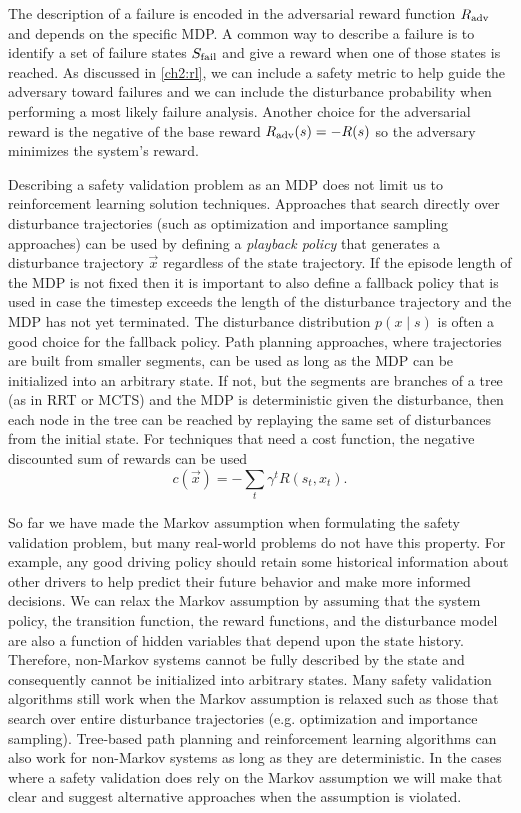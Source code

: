 The description of a failure is encoded in the adversarial reward function $R_{\rm adv}$ and depends on the specific MDP. A common way to describe a failure is to identify a set of failure states $S_{\rm fail}$ and give a reward when one of those states is reached. As discussed in \cref{ch2:rl}, we can include a safety metric to help guide the adversary toward failures and we can include the disturbance probability when performing a most likely failure analysis. Another choice for the adversarial reward is the negative of the base reward $R_{\rm adv}(s) = - R(s)$ so the adversary minimizes the system's reward. 

Describing a safety validation problem as an MDP does not limit us to reinforcement learning solution techniques. Approaches that search directly over disturbance trajectories (such as optimization and importance sampling approaches) can be used by defining a \emph{playback policy} that generates a disturbance trajectory $\vec{x}$ regardless of the state trajectory. If the episode length of the MDP is not fixed then it is important to also define a fallback policy that is used in case the timestep exceeds the length of the disturbance trajectory and the MDP has not yet terminated. The disturbance distribution $p(x \mid s)$ is often a good choice for the fallback policy. Path planning approaches, where trajectories are built from smaller segments, can be used as long as the MDP can be initialized into an arbitrary state. If not, but the segments are branches of a tree (as in RRT or MCTS) and the MDP is deterministic given the disturbance, then each node in the tree can be reached by replaying the same set of disturbances from the initial state. For techniques that need a cost function, the negative discounted sum of rewards can be used
\begin{equation}  
c(\vec{x}) =  -\sum_t \gamma^t R(s_t, x_t) \text{.}
\end{equation}

So far we have made the Markov assumption when formulating the safety validation problem, but many real-world problems do not have this property. For example, any good driving policy should retain some historical information about other drivers to help predict their future behavior and make more informed decisions. We can relax the Markov assumption by assuming that the system policy, the transition function, the reward functions, and the disturbance model are also a function of hidden variables that depend upon the state history. Therefore, non-Markov systems cannot be fully described by the state and consequently cannot be initialized into arbitrary states. Many safety validation algorithms still work when the Markov assumption is relaxed such as those that search over entire disturbance trajectories (e.g. optimization and importance sampling). Tree-based path planning and reinforcement learning algorithms can also work for non-Markov systems as long as they are deterministic. In the cases where a safety validation does rely on the Markov assumption we will make that clear and suggest alternative approaches when the assumption is violated. 

